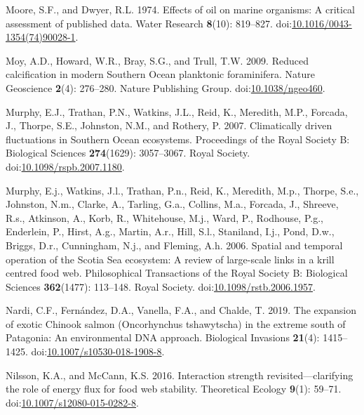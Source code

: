 \documentclass[
]{article}
\newlength{\cslhangindent}
\newenvironment{CSLReferences}[2] %
 {\begin{list}{}{%
  \setlength{\itemindent}{0pt}
  \setlength{\leftmargin}{0pt}
  \setlength{\parsep}{0pt}
  \ifodd #1
   \setlength{\leftmargin}{\cslhangindent}
   \setlength{\itemindent}{-1\cslhangindent}
  \fi
  \setlength{\itemsep}{#2\baselineskip}}}
 {\end{list}}
\begin{document}
\begin{CSLReferences}{1}{0}
Moore, S.F., and Dwyer, R.L. 1974. Effects of oil on marine organisms:
{A} critical assessment of published data. Water Research
\textbf{8}(10): 819--827.
doi:\href{https://doi.org/10.1016/0043-1354(74)90028-1}{10.1016/0043-1354(74)90028-1}.

Moy, A.D., Howard, W.R., Bray, S.G., and Trull, T.W. 2009. Reduced
calcification in modern {Southern Ocean} planktonic foraminifera. Nature
Geoscience \textbf{2}(4): 276--280. Nature Publishing Group.
doi:\href{https://doi.org/10.1038/ngeo460}{10.1038/ngeo460}.

Murphy, E.J., Trathan, P.N., Watkins, J.L., Reid, K., Meredith, M.P.,
Forcada, J., Thorpe, S.E., Johnston, N.M., and Rothery, P. 2007.
Climatically driven fluctuations in {Southern Ocean} ecosystems.
Proceedings of the Royal Society B: Biological Sciences
\textbf{274}(1629): 3057--3067. Royal Society.
doi:\href{https://doi.org/10.1098/rspb.2007.1180}{10.1098/rspb.2007.1180}.

Murphy, E.j., Watkins, J.l., Trathan, P.n., Reid, K., Meredith, M.p.,
Thorpe, S.e., Johnston, N.m., Clarke, A., Tarling, G.a., Collins, M.a.,
Forcada, J., Shreeve, R.s., Atkinson, A., Korb, R., Whitehouse, M.j.,
Ward, P., Rodhouse, P.g., Enderlein, P., Hirst, A.g., Martin, A.r.,
Hill, S.l., Staniland, I.j., Pond, D.w., Briggs, D.r., Cunningham, N.j.,
and Fleming, A.h. 2006. Spatial and temporal operation of the {Scotia
Sea} ecosystem: A review of large-scale links in a krill centred food
web. Philosophical Transactions of the Royal Society B: Biological
Sciences \textbf{362}(1477): 113--148. Royal Society.
doi:\href{https://doi.org/10.1098/rstb.2006.1957}{10.1098/rstb.2006.1957}.

Nardi, C.F., Fernández, D.A., Vanella, F.A., and Chalde, T. 2019. The
expansion of exotic {Chinook} salmon ({Oncorhynchus} tshawytscha) in the
extreme south of {Patagonia}: An environmental {DNA} approach.
Biological Invasions \textbf{21}(4): 1415--1425.
doi:\href{https://doi.org/10.1007/s10530-018-1908-8}{10.1007/s10530-018-1908-8}.

Nilsson, K.A., and McCann, K.S. 2016. Interaction strength
revisited---clarifying the role of energy flux for food web stability.
Theoretical Ecology \textbf{9}(1): 59--71.
doi:\href{https://doi.org/10.1007/s12080-015-0282-8}{10.1007/s12080-015-0282-8}.


\end{CSLReferences}
\end{document}
